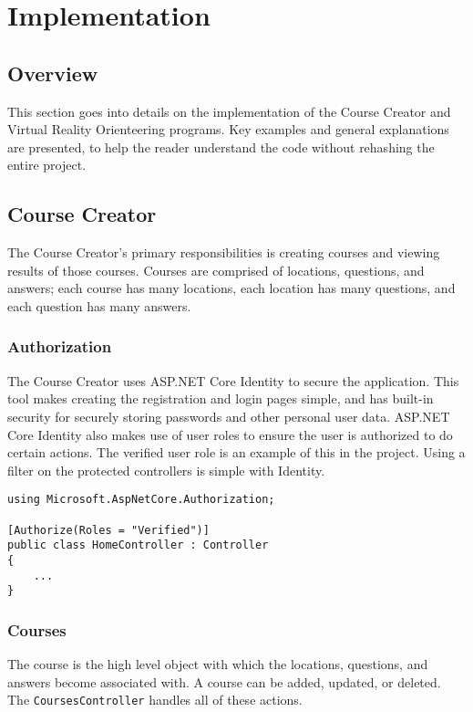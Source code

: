 \section{Implementation}																	
\label{sec:Implementation}

\subsection{Overview} 
This section goes into details on the implementation of the Course Creator and Virtual Reality Orienteering programs. Key examples and general explanations are presented, to help the reader understand the code without rehashing the entire project. 

\subsection{Course Creator}
The Course Creator's primary responsibilities is creating courses and viewing results of those courses. Courses are comprised of locations, questions, and answers; each course has many locations, each location has many questions, and each question has many answers. 

\subsubsection{Authorization}
The Course Creator uses ASP.NET Core Identity to secure the application. This tool makes creating the registration and login pages simple, and has built-in security for securely storing passwords and other personal user data. ASP.NET Core Identity also makes use of user roles to ensure the user is authorized to do certain actions. The verified user role is an example of this in the project. Using a filter on the protected controllers is simple with Identity.
\begin{lstlisting}[caption=Securing Controllers using Filter on User Role, label=lst:FilterUserRole]
using Microsoft.AspNetCore.Authorization;

[Authorize(Roles = "Verified")]
public class HomeController : Controller
{
	...
}
\end{lstlisting} 
\subsubsection{Courses}
The course is the high level object with which the locations, questions, and answers become associated with. A course can be added, updated, or deleted. The \lstinline{CoursesController} handles all of these actions. 

